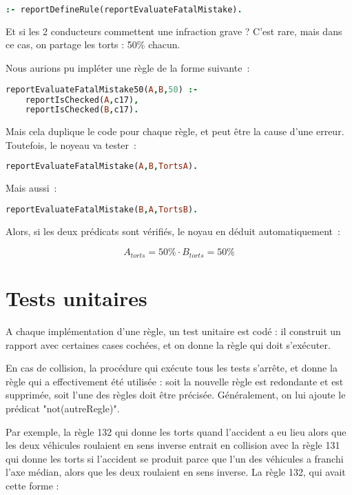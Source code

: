 \begin{lstlisting}[language=Prolog,frame=single]
:- reportDefineRule(reportEvaluateFatalMistake).
\end{lstlisting}

Et si les 2 conducteurs commettent une infraction grave ?
C'est rare, mais dans ce cas, on partage les torts : 50\% chacun.

Nous aurions pu impléter une règle de la forme suivante~:

\begin{lstlisting}[language=Prolog,frame=single]
reportEvaluateFatalMistake50(A,B,50) :-
    reportIsChecked(A,c17),
    reportIsChecked(B,c17).
\end{lstlisting}

Mais cela duplique le code pour chaque règle, et peut être la cause d'une erreur. Toutefois, le noyeau va tester~:

\begin{lstlisting}[language=Prolog,frame=single]
reportEvaluateFatalMistake(A,B,TortsA).
\end{lstlisting}

Mais aussi~:

\begin{lstlisting}[language=Prolog,frame=single]
reportEvaluateFatalMistake(B,A,TortsB).
\end{lstlisting}

Alors, si les deux prédicats sont vérifiés, le noyau en déduit automatiquement~:

\[A_{torts} = 50\% \cdot B_{torts} = 50\%\]

\section{Tests unitaires}

A chaque implémentation d'une règle, un test unitaire est codé : il construit un rapport avec certaines cases cochées, et on donne la règle qui doit s'exécuter.

En cas de collision, la procédure qui exécute tous les tests s'arrête, et donne la règle qui a effectivement été utilisée : soit la nouvelle règle est redondante et est supprimée, soit l'une des règles doit être précisée. Généralement, on lui ajoute le prédicat "not(autreRegle)".

Par exemple, la règle 132 qui donne les torts quand l'accident a eu lieu alors que les deux véhicules roulaient en sens inverse entrait en collision avec la règle 131 qui donne les torts si l'accident se produit parce que l'un des véhicules a franchi l'axe médian, alors que les deux roulaient en sens inverse.
La règle 132, qui avait cette forme :

